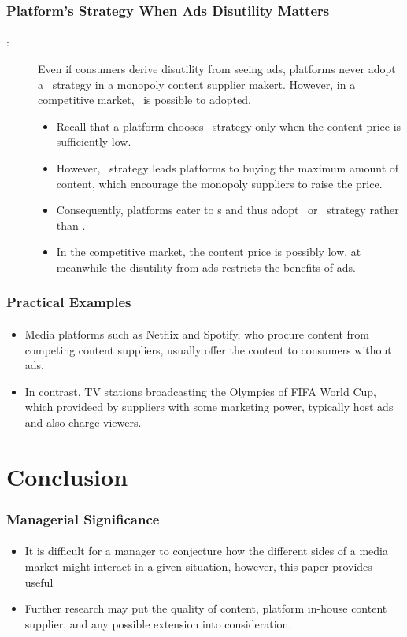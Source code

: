 \documentclass{beamer}
\newcommand{\hl}[1]{\textcolor{myblue}{#1}}
\newcommand{\adv}{\text{advertiser}}
\newcommand{\fc}{\textch{\hl{Free-content}}}
\newcommand{\nad}{\textch{\hl{No-ad}}}
\newcommand{\dual}{\textch{\hl{Dual}}}
\newcommand{\Pp}[1]{\text{Proposition #1}}
\begin{document}
\begin{frame}[label=current]
    \frametitle{Platform's Strategy When Ads Disutility Matters}
    \framesubtitle{}
    \begin{description}
        \item[\Pp{5}:] Even if consumers derive disutility from seeing ads,
            platforms never adopt a \nad\ strategy in a monopoly content supplier makert.
            However, in a competitive market, \nad\ is possible to adopted.
            \begin{itemize}
                \item Recall that a platform chooses \nad\ strategy only when
                    the content price is sufficiently low.
                \item However, \nad\ strategy leads platforms to buying the maximum amount
                    of content, which encourage the monopoly suppliers to raise the price.
                \item Consequently, platforms cater to \adv s and thus adopt \fc\ or
                    \dual\ strategy rather than \nad.
                \item In the competitive market, the content price is possibly low,
                    at meanwhile the disutility from ads restricts the benefits of ads.
            \end{itemize}
    \end{description}
\end{frame}

\begin{frame}[label=current]
    \frametitle{Practical Examples}
    \framesubtitle{}
    \begin{itemize}
        \item Media platforms such as Netflix and Spotify, who procure
            content from competing content suppliers, usually offer the content to consumers
            without ads.
        \item In contrast, TV stations broadcasting the Olympics of FIFA World Cup,
            which providecd by suppliers with some marketing power,
            typically host ads and also charge viewers.
    \end{itemize}
\end{frame}

\section{Conclusion}
\begin{frame}[label=current]
    \frametitle{Managerial Significance}
    \framesubtitle{}
    \begin{itemize}
        \item It is difficult for a manager to conjecture
            how the different sides of a media market might interact
            in a given situation, however, this paper provides useful
        \item Further research may put the quality of content, platform in-house
            content supplier, and any possible extension into consideration.
    \end{itemize}
\end{frame}

\begin{frame}[allowframebreaks]
    
\end{frame}

\end{document}
